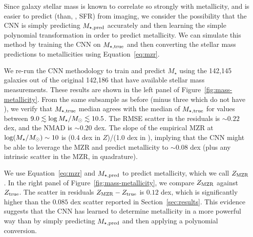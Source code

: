 \documentclass[fleqn,usenatbib]{mnras}
\begin{document}
Since galaxy stellar mass is known to correlate so strongly with metallicity, and is easier to predict (than, \eg, SFR) from \sdssi\sdssr\sdssg{} imaging, we consider the possibility that the CNN is simply predicting $M_{\star,\rm pred}$ accurately and then learning the simple polynomial transformation in order to predict metallicity. We can simulate this method by training the CNN on $M_{\star, \rm true}$ and then converting the stellar mass predictions to metallicities using Equation~\ref{eq:mzr}.

We re-run the CNN methodology to train and predict $M_{\star}$ using the 142,145 galaxies out of the original 142,186 that have available stellar mass measurements. These results are shown in the left panel of Figure~\ref{fig:mass-metallicity}. From the same subsample as before (minus three which do not have \mstar), we verify that $M_{\rm \star, true}$ median agrees with the median of $M_{\rm \star, true}$ for values between $9.0 \lesssim \log \hbox{$M_{\star}$} /\hbox{$M_\odot$} \lesssim 10.5$. The RMSE scatter in the \mstar residuals is $\sim 0.22$ dex, and the NMAD is $\sim 0.20$ dex. The slope of the empirical MZR at $\log (\hbox{$M_{\star}$} / \hbox{$M_\odot$}) \sim 10$ is (0.4 dex in $Z$)/(1.0 dex in \mstar), implying that the CNN might be able to leverage the MZR and predict metallicity to $\sim 0.08$ dex (plus any intrinsic scatter in the MZR, in quadrature).


We use Equation~\ref{eq:mzr} and $M_{\star,\rm pred}$ to predict metallicity, which we call $Z_{\rm MZR}$.
In the right panel of Figure~\ref{fig:mass-metallicity}, we compare $Z_{\rm MZR}$ against $Z_{\rm true}$.
The scatter in residuals $Z_{\rm MZR} - Z_{\rm true}$ is $0.12$ dex, which is significantly higher than the $0.085$ dex scatter reported in Section~\ref{sec:results}.
This evidence suggests that the CNN has learned to determine metallicity in a more powerful way than by simply predicting $M_{\rm \star,pred}$ and then applying a polynomial conversion.
\end{document}
